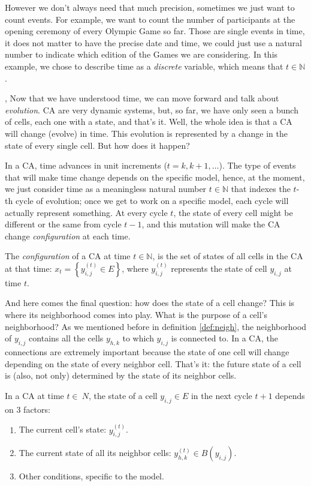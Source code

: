 However we don't always need that much precision, sometimes we just want to count events. For example,
we want to count the number of participants at the opening ceremony of every Olympic Game so far.
Those are single events in time, it does not matter to have the precise date and time, we could
just use a natural number to indicate which edition of the Games we are considering. In this example,
we chose to describe time as a \textit{discrete} variable, which means that $t \in \mathbb{N}$.

, Now that we have understood time, we can move forward and talk about \textit{evolution}.
CA are very dynamic systems, but, so far, we have only seen a bunch of cells, each one with a state, and
that's it. Well, the whole idea is that a CA will change (evolve) in time. This evolution is
represented by a change in the state of every single cell. But how does it happen?

In a CA, time advances in unit increments ($t=k, k+1, \dots$). 
The type of events that will make time change depends on the specific model,
hence, at the moment, we just consider time as a meaningless natural number $t \in \mathbb{N}$
that indexes the $t$-th cycle of evolution; once we get to work on a specific model, each cycle will
actually represent something.
At every cycle $t$,
the state of every cell might be different or the same from cycle $t-1$, and this mutation will make
the CA change \textit{configuration} at each time.

\begin{definition}[CA configuration]
The \textit{configuration} of a CA at time $t \in \mathbb{N}$, is the set of states of all cells
in the CA at that time: $x_t = \left\{ y^{(t)}_{i,j} \in E \right\}$, where
$y^{(t)}_{i,j}$ represents the state of cell $y_{i,j}$ at time $t$.
\end{definition}

And here comes the final question: how does the state of a cell change? This is where its
neighborhood comes into play.
What is the purpose of a cell's neighborhood? As we mentioned before in definition \ref{def:neigh},
the neighborhood of $y_{i,j}$ contains all the cells $y_{h,k}$ to which $y_{i,j}$ is connected to.
In a CA, the connections are extremely important because the state of one cell will change depending
on the state of every neighbor cell. That's it: the future state of a cell is (also, not only)
determined by the state of its neighbor cells.

\begin{proposition}
\label{prop:statechange}
In a CA at time $t \in \mathbb~{N}$,
the state of a cell $y_{i,j} \in E$ in the next cycle $t+1$ depends on 3 factors:
\begin{enumerate}
\item The current cell's state: $y^{(t)}_{i,j}$.
\item The current state of all its neighbor cells: $y^{(t)}_{h,k} \in B\left( y_{i,j} \right)$.
\item Other conditions, specific to the model.
\end{enumerate}
\end{proposition}

